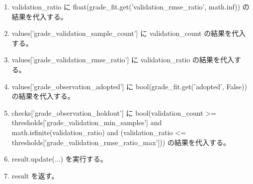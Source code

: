 \documentclass[a4paper,11pt]{article}
\begin{document}
\begin{enumerate}[leftmargin=1.8em]
\item   validation\_ratio に float(grade\_fit.get('validation\_rmse\_ratio', math.inf)) の結果を代入する。
\item   values['grade\_validation\_sample\_count'] に validation\_count の結果を代入する。
\item   values['grade\_validation\_rmse\_ratio'] に validation\_ratio の結果を代入する。
\item   values['grade\_observation\_adopted'] に bool(grade\_fit.get('adopted', False)) の結果を代入する。
\item   checks['grade\_observation\_holdout'] に bool(validation\_count >= thresholds['grade\_validation\_min\_samples'] and math.isfinite(validation\_ratio) and (validation\_ratio <= thresholds['grade\_validation\_rmse\_ratio\_max'])) の結果を代入する。
\item result.update(...) を実行する。
\item result を返す。
            \end{enumerate}
\end{document}
